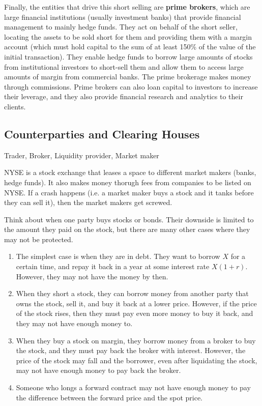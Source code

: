 \documentclass{article}
\begin{document}
    Finally, the entities that drive this short selling are \textbf{prime brokers}, which are large financial institutions (usually investment banks) that provide financial management to mainly hedge funds. They act on behalf of the short seller, locating the assets to be sold short for them and providing them with a margin account (which must hold capital to the sum of at least 150\% of the value of the initial transaction). They enable hedge funds to borrow large amounts of stocks from institutional investors to short-sell them and allow them to access large amounts of margin from commercial banks. The prime brokerage makes money through commissions. Prime brokers can also loan capital to investors to increase their leverage, and they also provide financial research and analytics to their clients. 

  \subsection{Counterparties and Clearing Houses}

    Trader, Broker, Liquidity provider, Market maker 

    NYSE is a stock exchange that leases a space to different market makers (banks, hedge funds). It also makes money thorugh fees from companies to be listed on NYSE. If a crash happens (i.e. a market maker buys a stock and it tanks before they can sell it), then the market makers get screwed. 

    Think about when one party buys stocks or bonds. Their downside is limited to the amount they paid on the stock, but there are many other cases where they may not be protected. 

    \begin{example}
      \begin{enumerate}
        \item The simplest case is when they are in debt. They want to borrow $X$ for a certain time, and repay it back in a year at some interest rate $X (1 + r)$. However, they may not have the money by then. 
        \item When they short a stock, they can borrow money from another party that owns the stock, sell it, and buy it back at a lower price. However, if the price of the stock rises, then they must pay even more money to buy it back, and they may not have enough money to. 
        \item When they buy a stock on margin, they borrow money from a broker to buy the stock, and they must pay back the broker with interest. However, the price of the stock may fall and the borrower, even after liquidating the stock, may not have enough money to pay back the broker.
        \item Someone who longs a forward contract may not have enough money to pay the difference between the forward price and the spot price.
      \end{enumerate}
    \end{example}
\end{document}
